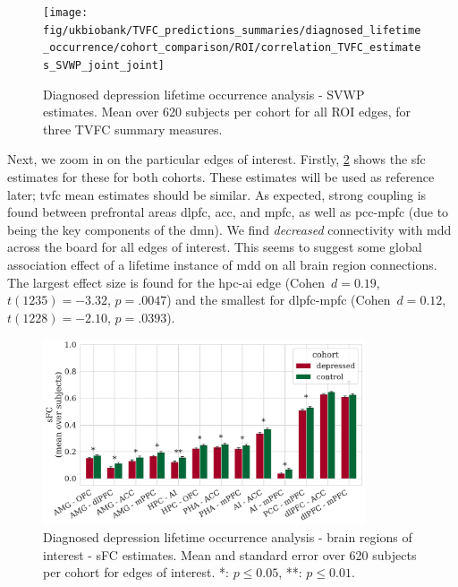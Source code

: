 \begin{figure}[ht]
  \centering
  \texttt{[image: fig/ukbiobank/TVFC\_predictions\_summaries/diagnosed\_lifetime\_occurrence/cohort\_comparison/ROI/correlation\_TVFC\_estimates\_SVWP\_joint\_joint]}
  \caption{
    Diagnosed depression lifetime occurrence analysis - SVWP estimates.
    Mean over 620 subjects per cohort for all ROI edges, for three TVFC summary measures.
  }
  \label{fig:ukb-results-dlo-roi-cohort-comparison-full-wp}
\end{figure}


Next, we zoom in on the particular edges of interest.
Firstly, \cref{fig:ukb-results-dlo-roi-cohort-comparison-edges-of-interest-sfc} shows the \gls{sfc} estimates for these for both cohorts.
These estimates will be used as reference later; \gls{tvfc} mean estimates should be similar.
As expected, strong coupling is found between prefrontal areas \gls{dlpfc}, \gls{acc}, and \gls{mpfc}, as well as \gls{pcc}-\gls{mpfc} (due to being the key components of the \gls{dmn}).
%
We find \emph{decreased} connectivity with \gls{mdd} across the board for all edges of interest.
This seems to suggest some global association effect of a lifetime instance of \gls{mdd} on all brain region connections.
The largest effect size is found for the \gls{hpc}-\gls{ai} edge (Cohen~$d = 0.19$, $t(1235) = -3.32$, $p = .0047$) and the smallest for \gls{dlpfc}-\gls{mpfc} (Cohen~$d = 0.12$, $t(1228) = -2.10$, $p = .0393$).


\begin{figure}[t]
  \centering
  \includegraphics[width=0.85\textwidth]{fig/ukbiobank/TVFC_predictions_summaries/diagnosed_lifetime_occurrence/cohort_comparison/ROI/correlation_TVFC_mean_sFC_edges_of_interest}
  \caption{
    Diagnosed depression lifetime occurrence analysis - brain regions of interest - sFC estimates.
    Mean and standard error over 620 subjects per cohort for edges of interest.
    *: $p \leq 0.05$, **: $p \leq 0.01$.
  }
  \label{fig:ukb-results-dlo-roi-cohort-comparison-edges-of-interest-sfc}
\end{figure}


